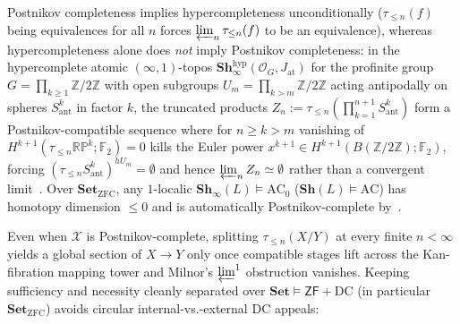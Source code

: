 \documentclass[10pt,twoside,openright]{book}
\theoremstyle{crmplain}
\theoremstyle{crmdef}
\theoremstyle{crmremark}
\begin{document}
Postnikov completeness implies hypercompleteness unconditionally ($\tau_{\le n}(f)$ being equivalences for all $n$ forces $\varprojlim_n \tau_{\le n}(f)$ to be an equivalence), whereas hypercompleteness alone does \emph{not} imply Postnikov completeness: in the hypercomplete atomic $(\infty, 1)$-topos $\mathbf{Sh}_\infty^{\mathrm{hyp}}(\mathcal{O}_G, J_{\mathrm{at}})$ for the profinite group $G = \prod_{k \ge 1} \mathbb{Z}/2\mathbb{Z}$ with open subgroups $U_m = \prod_{k > m} \mathbb{Z}/2\mathbb{Z}$ acting antipodally on spheres $S^k_{\mathrm{ant}}$ in factor $k$, the truncated products $Z_n := \tau_{\le n}(\prod_{k=1}^{n+1} S^k_{\mathrm{ant}})$ form a Postnikov-compatible sequence where for $n \ge k > m$ vanishing of $H^{k+1}(\tau_{\le n}\mathbb{RP}^k; \mathbb{F}_2) = 0$ kills the Euler power $x^{k+1} \in H^{k+1}(B(\mathbb{Z}/2\mathbb{Z}); \mathbb{F}_2)$, forcing $(\tau_{\le n} S^k_{\mathrm{ant}})^{hU_m} = \emptyset$ and hence $\varprojlim_n Z_n \simeq \emptyset$ rather than a convergent limit~\cite[\S 7.2.1]{Lurie09}. Over $\mathbf{Set}_{\mathrm{ZFC}}$, any $1$-localic $\mathbf{Sh}_\infty(L) \models \mathrm{AC}_0$ ($\mathbf{Sh}(L) \models \mathrm{AC}$) has homotopy dimension $\le 0$ and is automatically Postnikov-complete by~\cite[Corollary~7.2.1.12]{Lurie09}.

Even when $\mathcal{X}$ is Postnikov-complete, splitting $\tau_{\le n}(X/Y)$ at every finite $n < \infty$ yields a global section of $X \to Y$ only once compatible stages lift across the Kan-fibration mapping tower and Milnor's $\varprojlim^1$ obstruction vanishes. Keeping sufficiency and necessity cleanly separated over $\mathbf{Set} \models \mathsf{ZF} + \mathrm{DC}$ (in particular $\mathbf{Set}_{\mathrm{ZFC}}$) avoids circular internal-vs.-external $\mathrm{DC}$ appeals:
\end{document}
